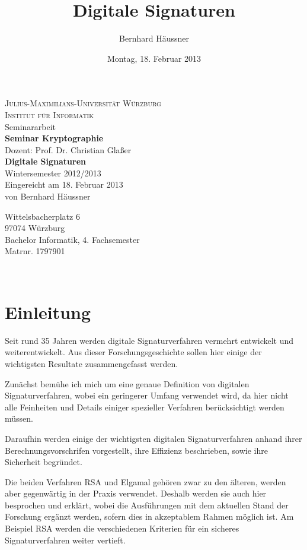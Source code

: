 \documentclass[a4paper,12pt,oneside]{scrreprt}
\title{Digitale Signaturen}
\author{Bernhard Häussner}
\date{Montag, 18. Februar 2013}
\begin{document}
\begin{titlepage}
\begin{center}
  \textsc{\LARGE Julius-Maximilians-Universität Würzburg}\\[0.5cm]
  \textsc{\Large Institut für Informatik}\\[5cm]
  Seminararbeit\\[0.3cm]
  {\Large \textbf{\sffamily Seminar Kryptographie}}\\[0.3cm]
  Dozent: Prof. Dr. Christian Glaßer\\[2cm]
  {\LARGE \textbf{\sffamily Digitale Signaturen}}\\[0.5cm]
  Wintersemester 2012/2013 \\[6cm]
  Eingereicht am 18. Februar 2013\\[0.3cm]
  von Bernhard Häussner\\[0.3cm]
  \begin{small}Wittelsbacherplatz 6\\
  97074 Würzburg\\[0.3cm]
  Bachelor Informatik, 4. Fachsemester\\
  Matrnr. 1797901\end{small}\\
\end{center}
\end{titlepage}

\renewcommand{\baselinestretch}{1.24} \normalsize

\tableofcontents




\chapter{Einleitung}

Seit rund 35 Jahren werden digitale Signaturverfahren vermehrt entwickelt und weiterentwickelt. Aus dieser Forschungsgeschichte sollen hier einige der wichtigsten Resultate zusammengefasst werden. 

Zunächst bemühe ich mich um eine genaue Definition von digitalen Signaturverfahren, wobei ein geringerer Umfang verwendet wird, da hier nicht alle Feinheiten und Details einiger spezieller Verfahren berücksichtigt werden müssen. 

Daraufhin werden einige der wichtigsten digitalen Signaturverfahren anhand ihrer Berechnungsvorschrifen vorgestellt, ihre Effizienz beschrieben, sowie ihre Sicherheit begründet. 

Die beiden Verfahren RSA und Elgamal gehören zwar zu den älteren, werden aber gegenwärtig in der Praxis verwendet. Deshalb werden sie auch hier besprochen und erklärt, wobei die Ausführungen mit dem aktuellen Stand der Forschung ergänzt werden, sofern dies in akzeptablem Rahmen möglich ist. Am Beispiel RSA werden die verschiedenen Kriterien für ein sicheres Signaturverfahren weiter vertieft. 
\end{document}
